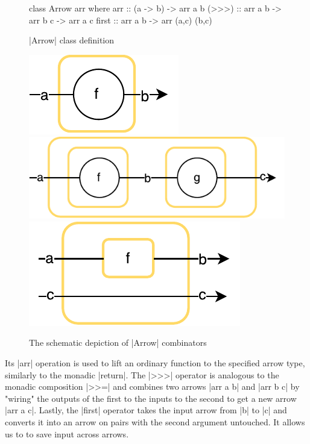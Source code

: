 \begin{figure}[t]
\centering
\parbox[c][16.5em]{0.49\linewidth}{%
\begin{center}
\vfill
\begin{code}
class Arrow arr where
  arr :: (a -> b) -> arr a b
  (>>>) :: arr a b -> arr b c -> arr a c
  first :: arr a b -> arr (a,c) (b,c)
\end{code}
\vfill
\end{center}
\caption{|Arrow| class definition}
\label{fig:ArrowDefinition}
}
\parbox[c][16.5em]{0.49\linewidth}{%
\vfill
\centering
	{\includegraphics[scale=0.6]{images/arr}}
	{\includegraphics[scale=0.6]{images/compose}}
	{\includegraphics[scale=0.6]{images/first}}
\vfill
\caption{The schematic depiction of |Arrow| combinators}
}
\end{figure}
Its |arr| operation is used to lift an ordinary function to the specified arrow type, similarly to the monadic |return|. The |>>>| operator is analogous to the monadic composition  |>>=| and combines two arrows |arr a b| and |arr b c| by "wiring" the outputs of the first to the inputs to the second to get a new arrow |arr a c|. Lastly, the |first| operator  takes the input arrow from |b| to |c| and converts it into an arrow on pairs with the second argument untouched. It allows us to to save input across arrows.
